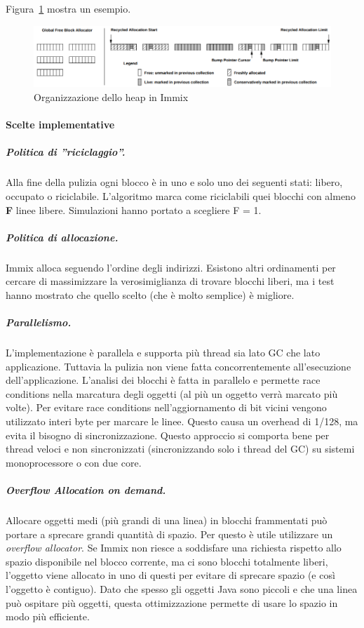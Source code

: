 Figura~\ref{fig:immixheap} mostra un esempio.
\begin{figure}[h]
	\centering
	\includegraphics[width=1.2\linewidth]{images/immixHeap}
	\caption[Organizzazione dello heap]{Organizzazione dello heap in Immix}
	\label{fig:immixheap}
\end{figure}

\paragraph{Scelte implementative} 
\subparagraph{Politica di ''riciclaggio''.} Alla fine della pulizia ogni blocco è in uno e solo uno dei seguenti stati: libero, occupato o riciclabile. L'algoritmo marca come riciclabili quei blocchi con almeno \textbf{F} linee libere. Simulazioni hanno portato a scegliere F = 1.
\subparagraph{Politica di allocazione.} Immix alloca seguendo l'ordine degli indirizzi. Esistono altri ordinamenti per cercare di massimizzare la verosimiglianza di trovare blocchi liberi, ma i test hanno mostrato che quello scelto (che è molto semplice) è migliore. 
\subparagraph{Parallelismo.} L'implementazione è parallela e supporta più thread sia lato GC che lato applicazione. Tuttavia la pulizia non viene fatta concorrentemente all'esecuzione dell'applicazione. L'analisi dei blocchi è fatta in parallelo e permette race conditions nella marcatura degli oggetti (al più un oggetto verrà marcato più volte). Per evitare race conditions nell'aggiornamento di bit vicini vengono utilizzato interi byte per marcare le linee. Questo causa un overhead di 1/128, ma evita il bisogno di sincronizzazione. Questo approccio si comporta bene per thread veloci e non sincronizzati (sincronizzando solo i thread del GC) su sistemi monoprocessore o con due core. 
\subparagraph{Overflow Allocation on demand.} Allocare oggetti medi (più grandi di una linea) in blocchi frammentati può portare a sprecare grandi quantità di spazio. Per questo è utile utilizzare un \textit{overflow allocator}. Se Immix non riesce a soddisfare una richiesta rispetto allo spazio disponibile nel blocco corrente, ma ci sono blocchi totalmente liberi, l'oggetto viene allocato in uno di questi per evitare di sprecare spazio (e così l'oggetto è contiguo). Dato che spesso gli oggetti Java sono piccoli e che una linea può ospitare più oggetti, questa ottimizzazione permette di usare lo spazio in modo più efficiente.

